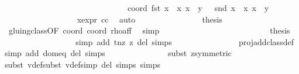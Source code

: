 \begin{isabellebody}
\ \ \ \ \ \ \ \ \ \ \ \ \isamarkupfalse%
\ {\isacharminus}\isanewline
\ \ \ \ \ \ \ \ \ \ \ \ \ \ \isamarkupfalse%
\ coord{\isacharcolon}\ {\isachardoublequoteopen}fst\ {\isacharparenleft}{\isacharparenleft}x\ {\isacharasterisk}\ x{\isacharprime}{\isacharcomma}\ x\ {\isacharasterisk}\ y{\isacharprime}{\isacharparenright}{\isacharparenright}\ {\isasymnoteq}\ {}{\isachardoublequoteclose}\ {\isachardoublequoteopen}snd\ {\isacharparenleft}{\isacharparenleft}x\ {\isacharasterisk}\ x{\isacharprime}{\isacharcomma}\ x\ {\isacharasterisk}\ y{\isacharprime}{\isacharparenright}{\isacharparenright}\ {\isasymnoteq}\ {}{\isachardoublequoteclose}\ \isanewline
\ \ \ \ \ \ \ \ \ \ \ \ \ \ \ \ \isamarkupfalse%
\ x{\isacharunderscore}expr\ cc\ \isamarkupfalse%
\ auto\isanewline
\ \ \ \ \ \ \ \ \ \ \ \ \ \ \isamarkupfalse%
\ {\isacharquery}thesis\isanewline
\ \ \ \ \ \ \ \ \ \ \ \ \ \ \ \ \isamarkupfalse%
\ gluing{\isacharunderscore}class{\isacharbrackleft}OF\ coord{\isacharparenleft}{}{\isacharparenright}\ coord{\isacharparenleft}{}{\isacharparenright}{\isacharbrackright}\ rho{\isacharunderscore}aff\ \isamarkupfalse%
\ simp\isanewline
\ \ \ \ \ \ \ \ \ \ \ \ \isamarkupfalse%
\isanewline
\ \ \ \ \ \ \ \ \ \ \ \ \isamarkupfalse%
\ {\isacharquery}thesis\isanewline
\ \ \ \ \ \ \ \ \ \ \ \ \ \ \isamarkupfalse%
\ {}\ \isamarkupfalse%
{\isacharparenleft}simp\ add{\isacharcolon}\ t{\isacharunderscore}nz\ z{}\ del{\isacharcolon}\ {\isasymtau}{\isachardot}simps{\isacharparenright}\isanewline
\ \ \ \ \ \ \ \ \ \ \ \ \ \ \isamarkupfalse%
\ proj{\isacharunderscore}add{\isacharunderscore}class{\isacharunderscore}def\ \isamarkupfalse%
{\isacharparenleft}simp\ add{\isacharcolon}\ dom{\isacharunderscore}eq\ del{\isacharcolon}\ {\isasymtau}{\isachardot}simps{\isacharparenright}\isanewline
\ \ \ \ \ \ \ \ \ \ \ \ \ \ \isamarkupfalse%
{\isacharparenleft}subst\ z{}{\isacharbrackleft}symmetric{\isacharbrackright}{\isacharparenright}{\isacharplus}\isanewline
\ \ \ \ \ \ \ \ \ \ \ \ \ \ \isamarkupfalse%
{\isacharparenleft}subst\ v{}{\isacharunderscore}def{\isacharcomma}subst\ v{}{\isacharunderscore}def{\isacharcomma}simp\ del{\isacharcolon}\ {\isasymtau}{\isachardot}simps\ {\isasymrho}{\isachardot}simps{\isacharparenright}\isanewline

\end{isabellebody}

